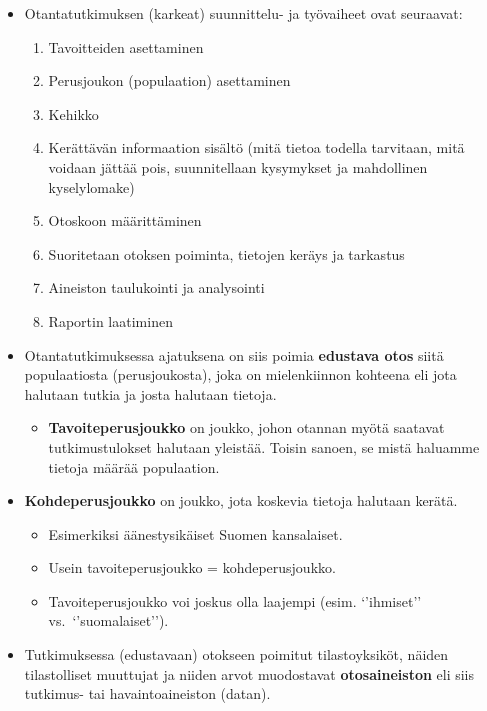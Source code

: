 \documentclass[
]{book}
\providecommand{\tightlist}{%
  \setlength{\itemsep}{0pt}\setlength{\parskip}{0pt}}
\begin{document}
\begin{itemize}
\tightlist
\item
  Otantatutkimuksen (karkeat) suunnittelu- ja työvaiheet ovat seuraavat:

  \begin{enumerate}
  \def\labelenumi{\arabic{enumi}.}
  \tightlist
  \item
    Tavoitteiden asettaminen
  \item
    Perusjoukon (populaation) asettaminen
  \item
    Kehikko
  \item
    Kerättävän informaation sisältö (mitä tietoa todella tarvitaan, mitä voidaan jättää pois, suunnitellaan kysymykset ja mahdollinen kyselylomake)
  \item
    Otoskoon määrittäminen
  \item
    Suoritetaan otoksen poiminta, tietojen keräys ja tarkastus
  \item
    Aineiston taulukointi ja analysointi
  \item
    Raportin laatiminen
  \end{enumerate}
\item
  Otantatutkimuksessa ajatuksena on siis poimia \textbf{edustava otos} siitä populaatiosta (perusjoukosta), joka on mielenkiinnon kohteena eli jota halutaan tutkia ja josta halutaan tietoja.

  \begin{itemize}
  \tightlist
  \item
    \textbf{Tavoiteperusjoukko} on joukko, johon otannan myötä saatavat tutkimustulokset halutaan yleistää. Toisin sanoen, se mistä haluamme tietoja määrää populaation.
  \end{itemize}
\item
  \textbf{Kohdeperusjoukko} on joukko, jota koskevia tietoja halutaan kerätä.

  \begin{itemize}
  \tightlist
  \item
    Esimerkiksi äänestysikäiset Suomen kansalaiset.
  \item
    Usein tavoiteperusjoukko = kohdeperusjoukko.
  \item
    Tavoiteperusjoukko voi joskus olla laajempi (esim. `'ihmiset'' vs.~`'suomalaiset'').
  \end{itemize}
\item
  Tutkimuksessa (edustavaan) otokseen poimitut tilastoyksiköt, näiden tilastolliset muuttujat ja niiden arvot muodostavat \textbf{otosaineiston} eli siis tutkimus- tai havaintoaineiston (datan).


\end{itemize}
\end{document}
